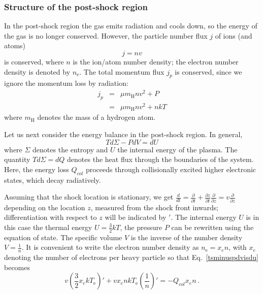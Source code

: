 \documentclass[graybox, nosecnum]{svmult}
\begin{document}
\subsubsection{Structure of the post-shock region}

In the post-shock region the gas emits radiation and cools down, so the energy of the gas is no longer conserved.  However, the particle number flux $j$ of ions (and atoms)
\begin{equation}j=nv\label{j_n}\end{equation}
is conserved, where $n$ is the ion/atom number density; the electron number density is denoted by $n_{\mathrm{e}}$. The total momentum flux $j_p$ is conserved, since we ignore the momentum loss by radiation:
\begin{eqnarray}
j_p&=&\mu m_{\mathrm{H}} n v^2+P \nonumber \\
   &=&\mu m_{\mathrm{H}} n v^2+nkT \label{j_p}
\end{eqnarray}
where $m_{\mathrm{H}}$ denotes the mass of a hydrogen atom.

Let us next consider the energy balance in the post-shock region. In general,
\begin{equation} \label{tsminuspdvisdu} T d\Sigma -P dV=dU \end{equation}
where $\Sigma$ denotes the entropy and $U$ the internal energy of the plasma. The quantity $T d\Sigma=dQ$ denotes the heat flux through the boundaries of the system. Here, the energy loss $Q_{col}$ proceeds through collisionally excited higher electronic states, which decay radiatively.

Assuming that the shock location is stationary, we get $\frac{d}{dt}=\frac{\partial}{\partial t}+\frac{\partial z}{\partial t}\frac{\partial}{\partial z}=v\frac{\partial}{\partial z}$ depending on the location $z$, measured from the shock front inwards; differentiation with respect to $z$ will be indicated by $'$.
The internal energy $U$ is in this case the thermal energy $U=\frac{3}{2}kT$, the pressure $P$ can be rewritten using the equation of state. The specific volume $V$ is the inverse of the number density $V=\frac{1}{n}$.
It is convenient to write the electron number density as \mbox{$n_{\mathrm{e}}=x_e n$,} with $x_e$ denoting the number of electrons per heavy particle so that Eq.~\ref{tsminuspdvisdu} becomes
\begin{equation}
\label{energyelec}
v\left(\frac{3}{2}x_e k T_{\mathrm{e}}\right)'+v x_e n k T_{\mathrm{e}} \left(\frac{1}{n}\right)'=-Q_{col} x_e n\,.
\end{equation}
\end{document}
